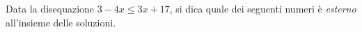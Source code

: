 Data la disequazione $3 - 4x \leq 3x + 17$,
si dica quale dei seguenti numeri è \emph{esterno} 
all'insieme delle soluzioni.
